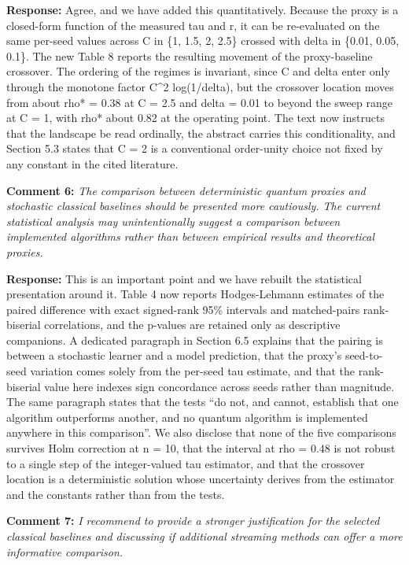 \documentclass[
  11pt,
]{article}
\begin{document}
\textbf{Response:} Agree, and we have added this quantitatively. Because
the proxy is a closed-form function of the measured tau and r, it can be
re-evaluated on the same per-seed values across C in \{1, 1.5, 2, 2.5\}
crossed with delta in \{0.01, 0.05, 0.1\}. The new Table 8 reports the
resulting movement of the proxy-baseline crossover. The ordering of the
regimes is invariant, since C and delta enter only through the monotone
factor C\^{}2 log(1/delta), but the crossover location moves from about
rho* = 0.38 at C = 2.5 and delta = 0.01 to beyond the sweep range at C =
1, with rho* about 0.82 at the operating point. The text now instructs
that the landscape be read ordinally, the abstract carries this
conditionality, and Section 5.3 states that C = 2 is a conventional
order-unity choice not fixed by any constant in the cited literature.

\textbf{Comment 6:} \emph{The comparison between deterministic quantum
proxies and stochastic classical baselines should be presented more
cautiously. The current statistical analysis may unintentionally suggest
a comparison between implemented algorithms rather than between
empirical results and theoretical proxies.}

\textbf{Response:} This is an important point and we have rebuilt the
statistical presentation around it. Table 4 now reports Hodges-Lehmann
estimates of the paired difference with exact signed-rank 95\% intervals
and matched-pairs rank-biserial correlations, and the p-values are
retained only as descriptive companions. A dedicated paragraph in
Section 6.5 explains that the pairing is between a stochastic learner
and a model prediction, that the proxy's seed-to-seed variation comes
solely from the per-seed tau estimate, and that the rank-biserial value
here indexes sign concordance across seeds rather than magnitude. The
same paragraph states that the tests ``do not, and cannot, establish
that one algorithm outperforms another, and no quantum algorithm is
implemented anywhere in this comparison''. We also disclose that none of
the five comparisons survives Holm correction at n = 10, that the
interval at rho = 0.48 is not robust to a single step of the
integer-valued tau estimator, and that the crossover location is a
deterministic solution whose uncertainty derives from the estimator and
the constants rather than from the tests.

\textbf{Comment 7:} \emph{I recommend to provide a stronger
justification for the selected classical baselines and discussing if
additional streaming methods can offer a more informative comparison.}
\end{document}
